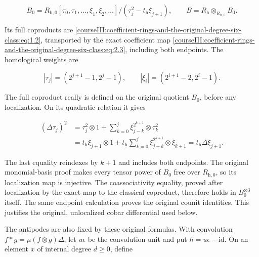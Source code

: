\begin{equation}
B_0=R_{\mathrm h,0}[\tau_0,\tau_1,\ldots,\xi_1,\xi_2,\ldots]/
                  (\tau_j^2-t_{\mathrm h}\xi_{j+1}),
 \qquad B=R_{\mathrm h}\otimes_{R_{\mathrm h,0}}B_0.
 \label{courseIII:coefficient-rings-and-the-original-degree-six-class:eq:4.1}
\end{equation}

Its full coproducts are \eqref{courseIII:coefficient-rings-and-the-original-degree-six-class:eq:1.2}, transported by the exact coefficient map \eqref{courseIII:coefficient-rings-and-the-original-degree-six-class:eq:2.3}, including both endpoints. The homological weights are

\begin{equation}
|\tau_j|=(2^{j+1}-1,2^j-1),
 \qquad
 |\xi_i|=(2^{i+1}-2,2^i-1).
 \label{courseIII:coefficient-rings-and-the-original-degree-six-class:eq:4.2}
\end{equation}

The full coproduct really is defined on the original quotient \(B_0\), before any localization. On its quadratic relation it gives

\begin{equation}
\begin{aligned}
 (\Delta\tau_j)^2
 &=\tau_j^2\otimes1+
       \sum_{k=0}^j\xi_{j-k}^{2^{k+1}}\otimes\tau_k^2\\
 &=t_{\mathrm h}\xi_{j+1}\otimes1+
       t_{\mathrm h}\sum_{k=0}^j
                    \xi_{j-k}^{2^{k+1}}\otimes\xi_{k+1}
 =t_{\mathrm h}\Delta\xi_{j+1}.
 \end{aligned}
 \label{courseIII:coefficient-rings-and-the-original-degree-six-class:eq:4.2a}
\end{equation}

The last equality reindexes by \(k+1\) and includes both endpoints. The original monomial-basis proof makes every tensor power of \(B_0\) free over \(R_{\mathrm h,0}\), so its localization map is injective. The coassociativity equality, proved after localization by the exact map to the classical coproduct, therefore holds in \(B_0^{\otimes3}\) itself. The same endpoint calculation proves the original counit identities. This justifies the original, unlocalized cobar differential used below.

The antipodes are also fixed by these original formulas. With convolution \(f*g=\mu(f\otimes g)\Delta\), let \(u\epsilon\) be the convolution unit and put \(h=u\epsilon-\mathrm{id}\). On an element \(x\) of internal degree \(d\geq0\), define

